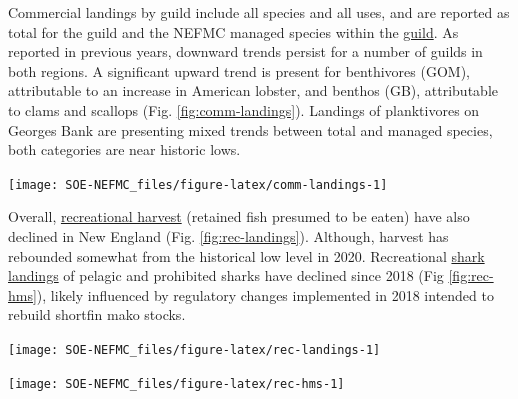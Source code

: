 \documentclass[
  10pt,
]{article}
\let\origfigure\figure
\let\endorigfigure\endfigure
\renewenvironment{figure}[1][2] {
    \expandafter\origfigure\expandafter[H]
} {
    \endorigfigure
}
\begin{document}
Commercial landings by guild include all species and all uses, and are reported as total for the guild and the NEFMC managed species within the \href{https://noaa-edab.github.io/catalog/feeding-guilds-by-management-bodies.html}{guild}. As reported in previous years, downward trends persist for a number of guilds in both regions. A significant upward trend is present for benthivores (GOM), attributable to an increase in American lobster, and benthos (GB), attributable to clams and scallops (Fig. \ref{fig:comm-landings}). Landings of planktivores on Georges Bank are presenting mixed trends between total and managed species, both categories are near historic lows.

\begin{figure}

{\centering \texttt{[image: SOE-NEFMC\_files/figure-latex/comm-landings-1]} 

}

\caption{Total commercial landings (black) and NEFMC managed U.S seafood landings (red) by feeding guild for the Gulf of Maine (GOM, right) and Georges Bank (GB, left).}\label{fig:comm-landings}
\end{figure}

Overall, \href{https://noaa-edab.github.io/catalog/recreational-fishing-indicators.html}{recreational harvest} (retained fish presumed to be eaten) have also declined in New England (Fig. \ref{fig:rec-landings}). Although, harvest has rebounded somewhat from the historical low level in 2020. Recreational \href{https://noaa-edab.github.io/catalog/rec_hms.html}{shark landings} of pelagic and prohibited sharks have declined since 2018 (Fig \ref{fig:rec-hms}), likely influenced by regulatory changes implemented in 2018 intended to rebuild shortfin mako stocks.

\begin{figure}

{\centering \texttt{[image: SOE-NEFMC\_files/figure-latex/rec-landings-1]} 

}

\caption{Total recreational seafood harvest (millions of pounds) in the New England region.}\label{fig:rec-landings}
\end{figure}
\begin{figure}

{\centering \texttt{[image: SOE-NEFMC\_files/figure-latex/rec-hms-1]} 

}

\caption{Recreational shark landings from Large Pelagics Survey.}\label{fig:rec-hms}
\end{figure}
\end{document}
